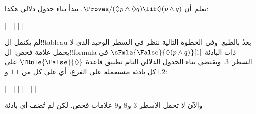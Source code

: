 \documentclass[../../../include/open-logic-section]{subfiles}
\begin{document}
{
\begin{ex}
  نعلم أن $\Proves/ (\Diamond p \land \Diamond q) \lif \Diamond(p
  \land q)$. يبدأ بناء جدول دلالي هكذا:
  \begin{oltableau}
    [\pFmla{\False}{(\Diamond p \land \Diamond q) \lif \Diamond(p \land q)}{1},
      just = \TAss, checked
      [\pFmla{\True}{\Diamond p \land \Diamond q}{1},
        just = {\TRule{\False}{\lif}[1]}, checked
        [\pFmla{\False}{\Diamond(p \land q)}{1},
          just = {\TRule{\False}{\lif}[1]}
          [\pFmla{\True}{\Diamond p}{1},
            just = {\TRule{\True}{\land}[2]}, checked
            [\pFmla{\True}{\Diamond q}{1},
              just = {\TRule{\True}{\land}[2]}, checked
              [\pFmla{\True}{p}{1.1}, 
                just = {\TRule{\True}{\Diamond}[4]}, checked
                [\pFmla{\True}{q}{1.2}, 
                  just = {\TRule{\True}{\Diamond}[5]}, checked
                ]
              ]
            ]
          ]
        ]
      ]
    ]
  \end{oltableau}
  لم يكتمل ال!!{tableau} بعدُ بالطبع. وفي الخطوة التالية ننظر في السطر
  الوحيد الذي لا يحمل علامة فحص: ال!!{formula} ذات البادئة
  $\sFmla{\False}{\Diamond(p \land q)}[1]$ في السطر~$3$. ويقتضي بناء
  الجدول الدلالي التام تطبيق قاعدة $\TRule{\False}{\Diamond}$ على كل
  بادئة مستعملة على الفرع، أي على كل من $1.1$ و$1.2$:
  \begin{oltableau}
    [\pFmla{\False}{(\Diamond p \land \Diamond q) \lif \Diamond(p \land q)}{1},
      just = \TAss, checked
      [\pFmla{\True}{\Diamond p \land \Diamond q}{1},
        just = {\TRule{\False}{\lif}[1]}, checked
        [\pFmla{\False}{\Diamond (p \land q)}{1},
          just = {\TRule{\False}{\lif}[1]}
          [\pFmla{\True}{\Diamond p}{1},
            just = {\TRule{\True}{\land}[2]}, checked
            [\pFmla{\True}{\Diamond q}{1},
              just = {\TRule{\True}{\land}[2]}, checked
              [\pFmla{\True}{p}{1.1}, 
                just = {\TRule{\True}{\Diamond}[4]}, checked
                [\pFmla{\True}{q}{1.2}, 
                  just = {\TRule{\True}{\Diamond}[5]}, checked
                  [\pFmla{\False}{p \land q}{1.1}, 
                    just = {\TRule{\False}{\Diamond}[3]}
                    [\pFmla{\False}{p \land q}{1.2}, 
                      just = {\TRule{\False}{\Diamond}[3]}
                    ]
                  ]
                ]
              ]
            ]
          ]
        ]
      ]
    ]
  \end{oltableau}
  والآن لا تحمل الأسطر 3 و8 و9 علامات فحص. لكن لم تُضف أي بادئة

\end{ex}}
\end{document}
